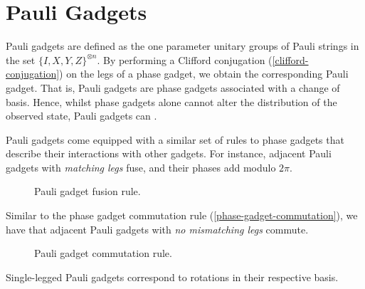 \section{Pauli Gadgets}%
\label{pauli-gadgets-section}

Pauli gadgets are defined as the one parameter unitary groups of Pauli strings in the set $\{I, X, Y, Z\}^{\otimes n}$. By performing a Clifford conjugation (\ref{clifford-conjugation}) on the legs of a phase gadget, we obtain the corresponding Pauli gadget. That is, Pauli gadgets are phase gadgets associated with a change of basis. Hence, whilst phase gadgets alone cannot alter the distribution of the observed state, Pauli gadgets can \cite{Yeung2020}. 


Pauli gadgets come equipped with a similar set of rules to phase gadgets that describe their interactions with other gadgets. For instance, adjacent Pauli gadgets with \textit{matching legs} fuse, and their phases add modulo $2\pi$.

\begin{figure}[H]
    \centering
    \caption{Pauli gadget fusion rule.}
    \label{pauli-gadget-fusion}
\end{figure}

Similar to the phase gadget commutation rule (\ref{phase-gadget-commutation}), we have that adjacent Pauli gadgets with \textit{no mismatching legs} commute.

\begin{figure}[H]
    \centering
    \caption{Pauli gadget commutation rule.}
    \label{pauli-gadget-commutation}
\end{figure}

Single-legged Pauli gadgets correspond to rotations in their respective basis.

\vspace{5pt}

